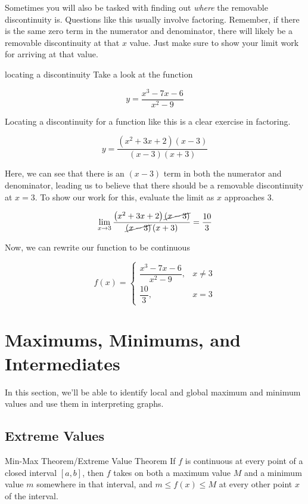 Sometimes you will also be tasked with finding out \textit{where} the removable discontinuity is. Questions like this usually involve factoring. Remember, if there is the same zero term in the numerator and denominator, there will likely be a removable discontinuity at that \( x \) value. Just make sure to show your limit work for arriving at that value.

\begin{example}{locating a discontinuity}
    Take a look at the function
    
    \[ y = \dfrac{x^3 - 7x - 6}{x^2 - 9} \]
    
    Locating a discontinuity for a function like this is a clear exercise in factoring.
    
    \[ y = \dfrac{\left( x^2 + 3x + 2 \right) \left( x - 3 \right)}{\left( x - 3 \right) \left( x + 3 \right)} \]
    
    Here, we can see that there is an \( \left( x - 3 \right) \) term in both the numerator and denominator, leading us to believe that there should be a removable discontinuity at \( x = 3 \). To show our work for this, evaluate the limit as \( x \) approaches \( 3 \).
    
    \[ \lim_{x \to 3} \dfrac{\left( x^2 + 3x + 2 \right) \cancel{\left( x - 3 \right)}}{\cancel{\left( x - 3 \right)} \left( x + 3 \right)} = \dfrac{10}{3} \]
    
    Now, we can rewrite our function to be continuous
    
    \[
    f \left( x \right) = \begin{cases}
        \dfrac{x^3 - 7x - 6}{x^2 - 9}, & x \ne 3 \\
        \dfrac{10}{3}, & x = 3
    \end{cases}
    \]
\end{example}

\section{Maximums, Minimums, and Intermediates}

In this section, we'll be able to identify local and global maximum and minimum values and use them in interpreting graphs.

\subsection{Extreme Values}

\begin{theorem}{Min-Max Theorem/Extreme Value Theorem}
    If \( f \) is continuous at every point of a closed interval \( [a, b] \), then \( f \) takes on both a maximum value \( M \) and a minimum value \( m \) somewhere in that interval, and \( m \le f \left( x \right) \le M \) at every other point \( x \) of the interval.
\end{theorem}

